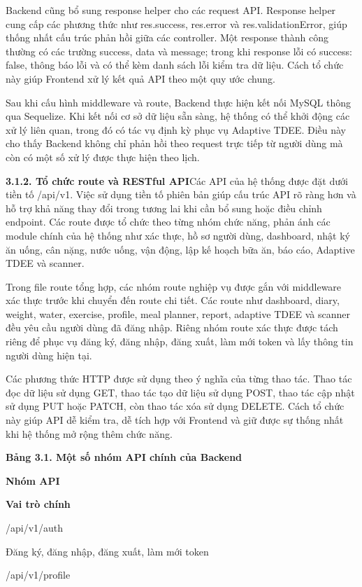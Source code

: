Backend cũng bổ sung response helper cho các request API. Response helper cung cấp các phương thức như res.success, res.error và res.validationError, giúp thống nhất cấu trúc phản hồi giữa các controller. Một response thành công thường có các trường success, data và message; trong khi response lỗi có success: false, thông báo lỗi và có thể kèm danh sách lỗi kiểm tra dữ liệu. Cách tổ chức này giúp Frontend xử lý kết quả API theo một quy ước chung.

Sau khi cấu hình middleware và route, Backend thực hiện kết nối MySQL thông qua Sequelize. Khi kết nối cơ sở dữ liệu sẵn sàng, hệ thống có thể khởi động các xử lý liên quan, trong đó có tác vụ định kỳ phục vụ Adaptive TDEE. Điều này cho thấy Backend không chỉ phản hồi theo request trực tiếp từ người dùng mà còn có một số xử lý được thực hiện theo lịch.

\textbf{3.1.2. Tổ chức route và RESTful API}Các API của hệ thống được đặt dưới tiền tố /api/v1. Việc sử dụng tiền tố phiên bản giúp cấu trúc API rõ ràng hơn và hỗ trợ khả năng thay đổi trong tương lai khi cần bổ sung hoặc điều chỉnh endpoint. Các route được tổ chức theo từng nhóm chức năng, phản ánh các module chính của hệ thống như xác thực, hồ sơ người dùng, dashboard, nhật ký ăn uống, cân nặng, nước uống, vận động, lập kế hoạch bữa ăn, báo cáo, Adaptive TDEE và scanner.

Trong file route tổng hợp, các nhóm route nghiệp vụ được gắn với middleware xác thực trước khi chuyển đến route chi tiết. Các route như dashboard, diary, weight, water, exercise, profile, meal planner, report, adaptive TDEE và scanner đều yêu cầu người dùng đã đăng nhập. Riêng nhóm route xác thực được tách riêng để phục vụ đăng ký, đăng nhập, đăng xuất, làm mới token và lấy thông tin người dùng hiện tại.

Các phương thức HTTP được sử dụng theo ý nghĩa của từng thao tác. Thao tác đọc dữ liệu sử dụng GET, thao tác tạo dữ liệu sử dụng POST, thao tác cập nhật sử dụng PUT hoặc PATCH, còn thao tác xóa sử dụng DELETE. Cách tổ chức này giúp API dễ kiểm tra, dễ tích hợp với Frontend và giữ được sự thống nhất khi hệ thống mở rộng thêm chức năng.

\textbf{Bảng 3.1. Một số nhóm API chính của Backend}

\textbf{Nhóm API}

\textbf{Vai trò chính}

/api/v1/auth

Đăng ký, đăng nhập, đăng xuất, làm mới token

/api/v1/profile

